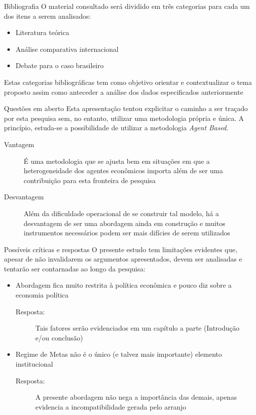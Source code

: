 \documentclass[pdf, xcolor=table]{beamer}
\begin{document}
\begin{frame}{Bibliografia}
    O material consultado será dividido em três categorias para cada um dos itens a serem analisados:
    \begin{itemize}
        \item Literatura teórica
        \item Análise comparativa internacional
        \item Debate para o caso brasileiro
    \end{itemize}
    Estas categorias bibliográficas tem como objetivo orientar e contextuali\-zar o tema proposto assim como anteceder a análise dos dados especificados anteriormente
\end{frame}


\begin{frame}{Questões em aberto}
    Esta apresentação tentou explicitar o caminho a ser traçado por esta pesquisa sem, no entanto, utilizar uma metodologia própria e única. A princípio, estuda-se a possibilidade de utilizar a metodologia \textit{Agent Based}. 
    
    \begin{description}
    \item[Vantagem] É uma metodologia que se ajusta bem em situações em que a heterogeneidade dos agentes econômicos importa além de ser uma contribuição para esta fronteira de pesquisa
    \item[Desvantagem] Além da dificuldade operacional de se construir tal modelo, há a desvantagem de ser uma abordagem ainda em construção e muitos instrumentos necessários podem ser mais difícies de serem utilizados
    \end{description}
\end{frame}

\begin{frame}{Possíveis críticas e respostas}
    O presente estudo tem limitações evidentes que, apesar de não invalidarem os argumentos apresentados, devem ser analisadas e tentarão ser contarnadas ao longo da pesquisa:
    \begin{itemize}
        \item Abordagem fica muito restrita à política econômica e pouco diz sobre a economia política
            \begin{description}
            \item[Resposta:] Tais fatores serão evidenciados em um capítulo a parte (Introdução e/ou conclusão)
            \end{description}
        \item Regime de Metas não é o único (e talvez mais importante) elemento institucional
             \begin{description}
            \item[Resposta:] A presente abordagem não nega a importância das demais, apenas evidencia a incompatibilidade gerada pelo arranjo
            \end{description}
       
    \end{itemize}
\end{frame}
\end{document}
